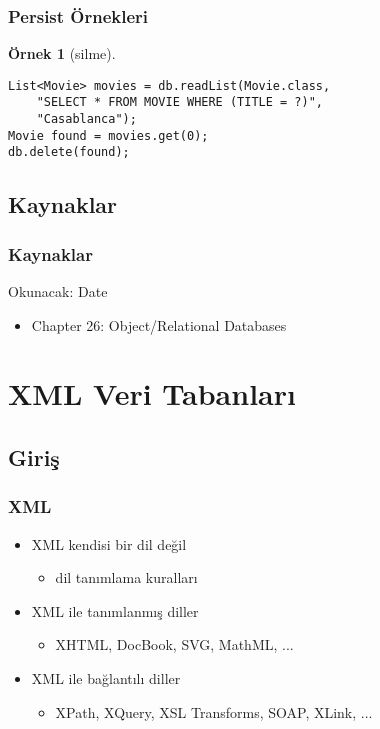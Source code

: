 \documentclass[dvipsnames]{beamer}
\theoremstyle{definition}
\theoremstyle{example}
\newtheorem{ornek}[theorem]{Örnek}
\theoremstyle{plain}
\begin{document}
\begin{frame}[fragile]
  \frametitle{Persist Örnekleri}

  \begin{ornek}[silme]
    \begin{lstlisting}
List<Movie> movies = db.readList(Movie.class,
    "SELECT * FROM MOVIE WHERE (TITLE = ?)",
    "Casablanca");
Movie found = movies.get(0);
db.delete(found);
    \end{lstlisting}
  \end{ornek}
\end{frame}

\subsection*{Kaynaklar}

\begin{frame}
  \frametitle{Kaynaklar}

  \begin{block}{Okunacak: Date}
    \begin{itemize}
      \item Chapter 26: \alert{Object/Relational Databases}
    \end{itemize}
  \end{block}
\end{frame}


\section{XML Veri Tabanları}

\subsection{Giriş}

\begin{frame}
  \frametitle{XML}

  \begin{itemize}
    \item XML kendisi bir dil değil
    \begin{itemize}
      \item dil tanımlama kuralları
    \end{itemize}

    \pause
    \item XML ile tanımlanmış diller
    \begin{itemize}
      \item XHTML, DocBook, SVG, MathML, ...
    \end{itemize}

    \pause
    \item XML ile bağlantılı diller
    \begin{itemize}
      \item XPath, XQuery, XSL Transforms, SOAP, XLink, ...
    \end{itemize}
  \end{itemize}
\end{frame}
\end{document}
